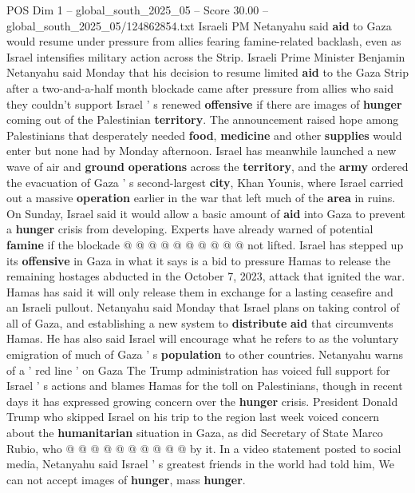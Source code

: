 \begin{textsample}{POS Dim 1 – global\_south\_2025\_05 – Score 30.00 – global\_south\_2025\_05/124862854.txt}  \label{ex:f1_pos_070}
Israeli PM Netanyahu said \textbf{aid} to Gaza would resume under pressure from allies fearing famine-related backlash, even as Israel intensifies military action across the Strip.
Israeli Prime Minister Benjamin Netanyahu said Monday that his decision to resume limited \textbf{aid} to the Gaza Strip after a two-and-a-half month blockade came after pressure from allies who said they couldn't support Israel ' s renewed \textbf{offensive} if there are images of \textbf{hunger} coming out of the Palestinian \textbf{territory}.
The announcement raised hope among Palestinians that desperately needed \textbf{food}, \textbf{medicine} and other \textbf{supplies} would enter but none had by Monday afternoon.
Israel has meanwhile launched a new wave of air and \textbf{ground} \textbf{operations} across the \textbf{territory}, and the \textbf{army} ordered the evacuation of Gaza ' s second-largest \textbf{city}, Khan Younis, where Israel carried out a massive \textbf{operation} earlier in the war that left much of the \textbf{area} in ruins.
On Sunday, Israel said it would allow a basic amount of \textbf{aid} into Gaza to prevent a \textbf{hunger} crisis from developing.
Experts have already warned of potential \textbf{famine} if the blockade @ @ @ @ @ @ @ @ @ @ not lifted.
Israel has stepped up its \textbf{offensive} in Gaza in what it says is a bid to pressure Hamas to release the remaining hostages abducted in the October 7, 2023, attack that ignited the war.
Hamas has said it will only release them in exchange for a lasting ceasefire and an Israeli pullout.
Netanyahu said Monday that Israel plans on taking control of all of Gaza, and establishing a new system to \textbf{distribute} \textbf{aid} that circumvents Hamas.
He has also said Israel will encourage what he refers to as the voluntary emigration of much of Gaza ' s \textbf{population} to other countries.
Netanyahu warns of a ' red line ' on Gaza The Trump administration has voiced full support for Israel ' s actions and blames Hamas for the toll on Palestinians, though in recent days it has expressed growing concern over the \textbf{hunger} crisis.
President Donald Trump who skipped Israel on his trip to the region last week voiced concern about the \textbf{humanitarian} situation in Gaza, as did Secretary of State Marco Rubio, who @ @ @ @ @ @ @ @ @ @ by it.
In a video statement posted to social media, Netanyahu said Israel ' s greatest friends in the world had told him, We can not accept images of \textbf{hunger}, mass \textbf{hunger}.

\end{textsample}

